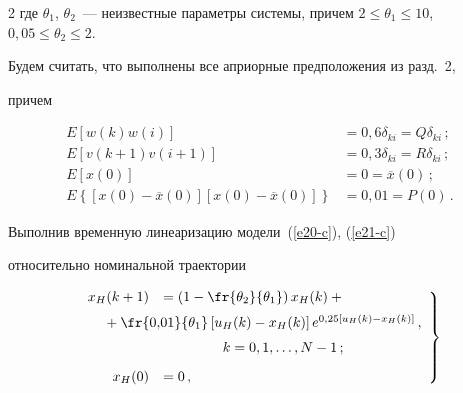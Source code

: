 \begin{multicols}{2}
где $\theta_1$, $\theta_2$~--- неизвестные параметры системы, причем $2\leq


\theta_1\leq 10$, $0{,}05\leq \theta_2\leq 2$.





  Будем считать, что выполнены все априорные предположения из разд.~2,


причем


  \begin{align*}


  E\left[ w(k) w(i)\right] & = 0{,}6\delta_{ki}=Q\delta_{ki}\,;\\


  E\left[ v(k+1) v(i+1)\right] &=0{,}3\delta_{ki}=R\delta_{ki}\,;\\


  E\left[x(0)\right] &=0=\overline{x}(0)\,;\\


  E\left\{\left[ x(0)-\overline{x}(0)\right]\left[ x(0)-


\overline{x}(0)\right]\right\}&=0{,}01=P(0)\,.


  \end{align*}





  Выполнив временную линеаризацию модели~(\ref{e20-c}), (\ref{e21-c})


относительно номинальной траектории


\begin{equation}


\left.


\begin{array}{rl}


x_H(k+1)  &=\left(1-\fr{\theta_2}{\theta_1}\right) x_H(k)+{}\\[6pt]


&\hspace*{-15mm}{}+\fr{0{,}01}{\theta_1}\left[


u_H(k)-x_H(k)\right] e^{0{,}25[u_H(k)-x_H(k)]}\,,\\[6pt] 


&\hspace*{15mm}k=0,1, \ldots ,N-1\,;\\[9pt]


x_H(0)&=0\,,


\end{array}


\right \}


\label{e22-c}



\end{equation}
\end{multicols}
